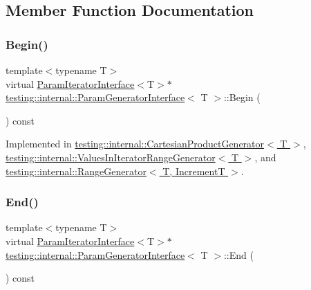 \subsection{Member Function Documentation}
\mbox{\label{classtesting_1_1internal_1_1ParamGeneratorInterface_ae1de83b16fe9a53c67778a026c6a9569}} 
\subsubsection{\texorpdfstring{Begin()}{Begin()}}
{\footnotesize\ttfamily template$<$typename T$>$ \\
virtual \hyperlink{classtesting_1_1internal_1_1ParamIteratorInterface}{Param\+Iterator\+Interface}$<$T$>$$\ast$ \hyperlink{classtesting_1_1internal_1_1ParamGeneratorInterface}{testing\+::internal\+::\+Param\+Generator\+Interface}$<$ T $>$\+::Begin (\begin{DoxyParamCaption}{ }\end{DoxyParamCaption}) const\hspace{0.3cm}{\ttfamily [pure virtual]}}



Implemented in \hyperlink{classtesting_1_1internal_1_1CartesianProductGenerator_ad2f1bc6289b6dd7e4b5f4fecbfdf2883}{testing\+::internal\+::\+Cartesian\+Product\+Generator$<$ T $>$}, \hyperlink{classtesting_1_1internal_1_1ValuesInIteratorRangeGenerator_a71ffed6f1deba05f11c9d45f6ab5b85d}{testing\+::internal\+::\+Values\+In\+Iterator\+Range\+Generator$<$ T $>$}, and \hyperlink{classtesting_1_1internal_1_1RangeGenerator_a502913fbcf14e89d5765dfb44f3c1295}{testing\+::internal\+::\+Range\+Generator$<$ T, Increment\+T $>$}.

\mbox{\label{classtesting_1_1internal_1_1ParamGeneratorInterface_afa7211b74990e11d3fc7ad4e7113da4f}} 
\subsubsection{\texorpdfstring{End()}{End()}}
{\footnotesize\ttfamily template$<$typename T$>$ \\
virtual \hyperlink{classtesting_1_1internal_1_1ParamIteratorInterface}{Param\+Iterator\+Interface}$<$T$>$$\ast$ \hyperlink{classtesting_1_1internal_1_1ParamGeneratorInterface}{testing\+::internal\+::\+Param\+Generator\+Interface}$<$ T $>$\+::End (\begin{DoxyParamCaption}{ }\end{DoxyParamCaption}) const\hspace{0.3cm}{\ttfamily [pure virtual]}}



